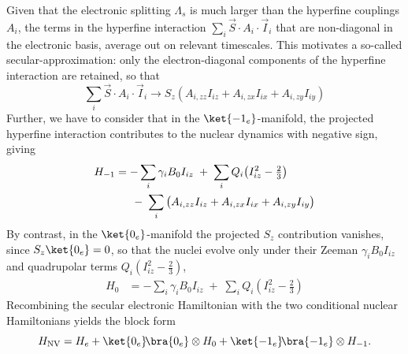 \documentclass[
  aps,
  pra,
  reprint,            %
  superscriptaddress, %
  amsmath,amssymb,
  notitlepage
]{revtex4-2}
\begin{document}
Given that the electronic splitting $\Lambda_s$ is much larger than the hyperfine couplings $A_i$, the terms in the hyperfine interaction \(\sum_i \vec S\cdot A_i\cdot \vec I_i\) that are non-diagonal in the electronic basis, average out on relevant timescales. This motivates a so-called secular-approximation: only the electron-diagonal components of the hyperfine interaction are retained, so that
\[
\sum_i \vec S\cdot A_i\cdot \vec I_i \longrightarrow
S_z\left(A_{i,zz}I_{iz}+
A_{i,zx}I_{ix}+
A_{i,zy}I_{iy}\right)
\]
Further, we have to consider that in the $\ket{-1_e}$-manifold, the projected hyperfine interaction contributes to the nuclear dynamics with negative sign, giving
\begin{equation}
\begin{aligned}
H_{-1} &= -\sum_i \gamma_i B_0 I_{iz} \;+\; \sum_i Q_i\!\left(I_{iz}^2-\tfrac{2}{3}\right)\\
&\hspace{0.43cm}\;-\; \sum_i \big(A_{i,zz} I_{iz}+A_{i,zx} I_{ix}+A_{i,zy} I_{iy}\big) \label{eq:H-1_def}
\end{aligned}
\end{equation}
By contrast, in the $\ket{0_e}$-manifold the projected $S_z$ contribution vanishes, since $S_z\ket{0_e}=0$, so that the nuclei evolve only under their Zeeman $\gamma_i B_0 I_{iz}$ and quadrupolar terms $Q_i\!\left(I_{iz}^2-\tfrac{2}{3}\right)$,
\begin{equation}
\begin{aligned}
H_{0} &= -\sum_i \gamma_i B_0 I_{iz} \;+\; \sum_i Q_i\!\left(I_{iz}^2-\tfrac{2}{3}\right)
\label{eq:H0_def}
\end{aligned}
\end{equation}
Recombining the secular electronic Hamiltonian with the two conditional nuclear Hamiltonians yields the block form
\begin{equation}
H_{\mathrm{NV}}
= H_e
+ \ket{0_e}\!\bra{0_e}\otimes H_{0}
+ \ket{-1_e}\!\bra{-1_e}\otimes H_{-1}.
\label{eq:block_form}
\end{equation}
\end{document}
